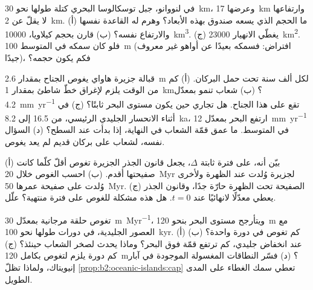 \begin{exercise}[$\star\star$]\label{exo:b2:oceanic-islands:8}
في  لنووانو، جبل توسكالوسا البحري كتلة طولها نحو \qty{30}{km}،
وعرضها \qty{17}{km} وارتفاعها لا يقلّ عن \qty{2}{km}. (أ) ما الحجم الذي يسعه صندوق بهذه الأبعاد؟
وهرم له القاعدة نفسها والارتفاع نفسه؟ (ب) قارن بحجم
كيلاويا، \qty{10000}{km^3}. (ج) يغطّي الانهيار \qty{23000}{km^2}. فلو كان سمكه في المتوسط
\qty{100}{m} (افتراض: فسمكه بعيدًا عن أواهو غير معروف جيدًا)، فكم يكون
حجمه؟
\end{exercise}

\begin{exercise}[$\star\star$]\label{exo:b2:oceanic-islands:9}
قبالة جزيرة هاواي يغوص الجناح بمقدار \qty{2.6}{m} لكل ألف سنة تحت حمل
البركان. (أ) كم من الوقت يلزم لإغراق خطّ شاطئ بمقدار \qty{1}{km}؟ (ب) شعاب تنمو بمعدّل
\qty{4.2}{mm.yr^{-1}} تقع على هذا الجناح. هل تجاري حين يكون مستوى البحر ثابتًا؟ (ج) في أثناء
الانحسار الجليدي الرئيسي، من 16.5 إلى \qty{8.2}{ka}، ارتفع البحر بمعدّل \qty{12}{mm.yr^{-1}} في المتوسط. ما
عمق قمّة الشعاب في النهاية، إذا بدأت عند السطح؟ (د) السؤال نفسه، لشعاب على
بركان قديم لم يعد يغوص.
\end{exercise}

\begin{exercise}[$\star\star\star$]\label{exo:b2:oceanic-islands:10}
(أ) بيّن أنه، على فترة ثابتة $\Delta$، يجعل قانون الجذر الجزيرة تغوص أقلّ كلّما كانت صفيحتها
أقدم. (ب) احسب الغوص خلال \qty{20}{Myr} لجزيرة وُلدت عند الظهرة ولأخرى وُلدت
على صفيحة عمرها \qty{50}{Myr}. (ج) الصفيحة تحت الظهرة حارّة جدًا، وقانون الجذر يعطي
معدّلًا لانهائيًا عند $t = 0$. هل هذه مشكلة للغوص على فترة منتهية؟ علّل.
\end{exercise}

\begin{exercise}[$\star\star\star$]\label{exo:b2:oceanic-islands:11}
تغوص حلقة مرجانية بمعدّل \qty{30}{m.Myr^{-1}}، ويتأرجح مستوى البحر بنحو \qty{120}{m} مع العصور
الجليدية، في دورات طولها نحو \qty{100}{kyr}. (أ) كم تغوص  في دورة واحدة؟ (ب) عند
انخفاض جليدي، كم ترتفع قمّة  فوق البحر؟ وماذا يحدث لصخر
الشعاب حينئذ؟ (ج) كم دورة يلزم لتغوص  بكامل \qty{120}{m}؟
(د) فسّر النطاقات المغسولة الموجودة في آبار إنيويتاك، ولماذا
تظلّ \cref{prop:b2:oceanic-islands:cap} تعطي سمك الغطاء على المدى الطويل.
\end{exercise}

